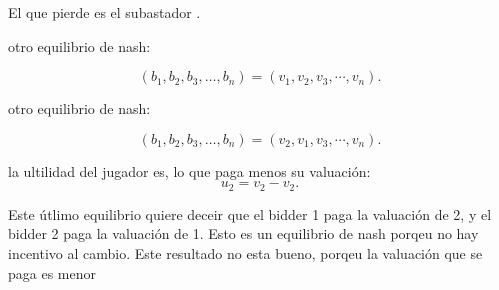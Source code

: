 El que pierde es el subastador .

otro equilibrio de nash:

\[
	(b_1, b_2, b_3, \ldots, b_n)	=  (v_1, v_{2}, v_3, \cdots, v_n)
.\] 


otro equilibrio de nash:

\[
	(b_1, b_2, b_3, \ldots, b_n)	=  (v_2, v_{1}, v_3, \cdots, v_n)
.\] 

la ultilidad del jugador es, lo que paga menos su valuación: 
\[
u_2 = v_2 - v_2
.\] 

Este útlimo equilibrio quiere deceir que el bidder 1 paga la valuación de 2, y el bidder 2 paga la valuación de 1. Esto es un equilibrio de nash
porqeu no hay incentivo al cambio. Este resultado no esta bueno, porqeu la valuación que se paga es menor





















